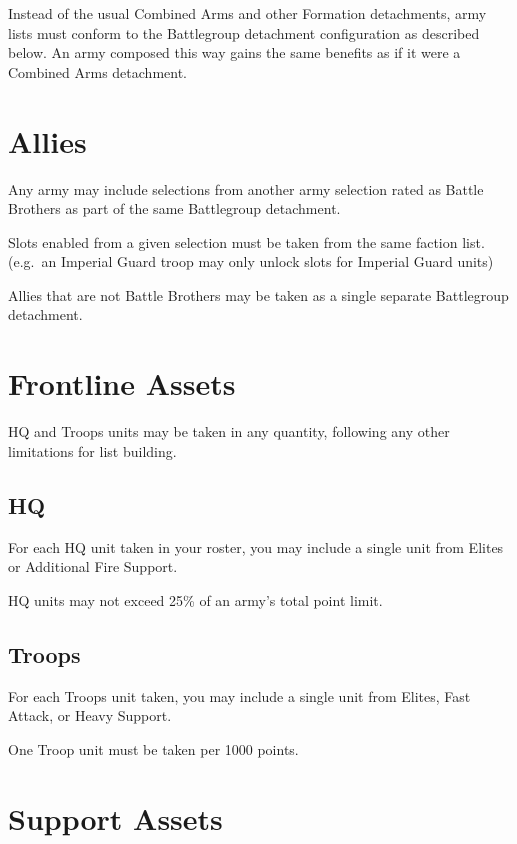 \documentclass[letterpaper,twocolumn,oneside,titlepage]{book}
\begin{document}
Instead of the usual Combined Arms and other Formation detachments, army
lists must conform to the Battlegroup detachment configuration as
described below. An army composed this way gains the same benefits as if
it were a Combined Arms detachment.

\section{\texorpdfstring{\textbf{Allies}}{Allies}}\label{allies}

Any army may include selections from another army selection rated as
Battle Brothers as part of the same Battlegroup detachment.

Slots enabled from a given selection must be taken from the same faction
list. (e.g.~an Imperial Guard troop may only unlock slots for Imperial
Guard units)

Allies that are not Battle Brothers may be taken as a single separate
Battlegroup detachment.

\section{\texorpdfstring{\textbf{Frontline
Assets}}{Frontline Assets}}\label{frontline-assets}

HQ and Troops units may be taken in any quantity, following any other
limitations for list building.

\subsection{\texorpdfstring{\textbf{HQ}}{HQ}}\label{hq}

For each HQ unit taken in your roster, you may include a single unit
from Elites or Additional Fire Support.

HQ units may not exceed 25\% of an army's total point limit.

\subsection{\texorpdfstring{\textbf{Troops}}{Troops}}\label{troops}

For each Troops unit taken, you may include a single unit from Elites,
Fast Attack, or Heavy Support.

One Troop unit must be taken per 1000 points.

\section{\texorpdfstring{\textbf{Support
Assets}}{Support Assets}}\label{support-assets}
\end{document}
